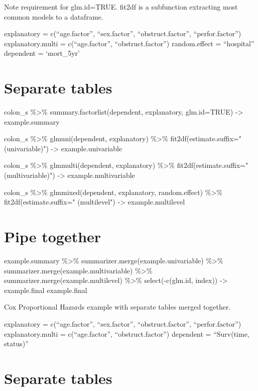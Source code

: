 \documentclass[]{article}
\begin{document}
Note requirement for glm.id=TRUE. fit2df is a subfunction extracting
most common models to a dataframe.

explanatory = c(``age.factor'', ``sex.factor'', ``obstruct.factor'',
``perfor.factor'') explanatory.multi = c(``age.factor'',
``obstruct.factor'') random.effect = ``hospital'' dependent =
`mort\_5yr'

\hypertarget{separate-tables}{%
\section{Separate tables}\label{separate-tables}}

colon\_s \%\textgreater\% summary.factorlist(dependent, explanatory,
glm.id=TRUE) -\textgreater{} example.summary

colon\_s \%\textgreater\% glmuni(dependent, explanatory)
\%\textgreater\% fit2df(estimate.suffix=" (univariable)")
-\textgreater{} example.univariable

colon\_s \%\textgreater\% glmmulti(dependent, explanatory)
\%\textgreater\% fit2df(estimate.suffix=" (multivariable)")
-\textgreater{} example.multivariable

colon\_s \%\textgreater\% glmmixed(dependent, explanatory,
random.effect) \%\textgreater\% fit2df(estimate.suffix=" (multilevel")
-\textgreater{} example.multilevel

\hypertarget{pipe-together}{%
\section{Pipe together}\label{pipe-together}}

example.summary \%\textgreater\% summarizer.merge(example.univariable)
\%\textgreater\% summarizer.merge(example.multivariable)
\%\textgreater\% summarizer.merge(example.multilevel) \%\textgreater\%
select(-c(glm.id, index)) -\textgreater{} example.final example.final

Cox Proportional Hazards example with separate tables merged together.

explanatory = c(``age.factor'', ``sex.factor'', ``obstruct.factor'',
``perfor.factor'') explanatory.multi = c(``age.factor'',
``obstruct.factor'') dependent = ``Surv(time, status)''

\hypertarget{separate-tables-1}{%
\section{Separate tables}\label{separate-tables-1}}
\end{document}
